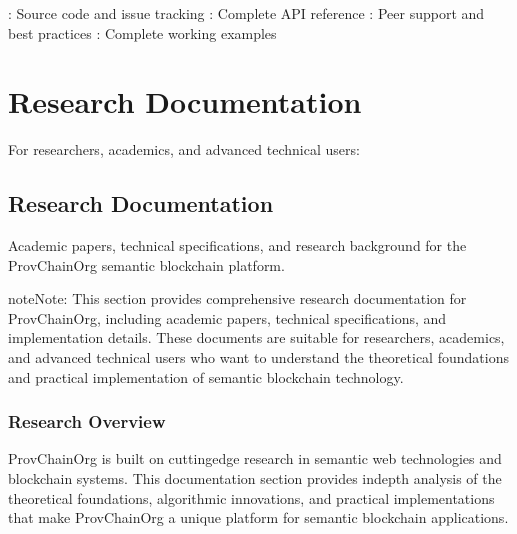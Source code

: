 \documentclass[letterpaper,10pt,english]{sphinxmanual}
\begin{document}
\sphinxAtStartPar
{}
\sphinxhyphen{} : Source code and issue tracking
\sphinxhyphen{} : Complete API reference
\sphinxhyphen{} : Peer support and best practices
\sphinxhyphen{} : Complete working examples




\section{Research Documentation}
\label{\detokenize{index:research-documentation}}
\sphinxAtStartPar
For researchers, academics, and advanced technical users:

\sphinxstepscope


\subsection{Research Documentation}
\label{\detokenize{research/index:research-documentation}}\label{\detokenize{research/index::doc}}
\sphinxAtStartPar
Academic papers, technical specifications, and research background for the ProvChainOrg semantic blockchain platform.



\begin{sphinxadmonition}{note}{Note:}
\sphinxAtStartPar
This section provides comprehensive research documentation for ProvChainOrg, including academic papers, technical specifications, and implementation details. These documents are suitable for researchers, academics, and advanced technical users who want to understand the theoretical foundations and practical implementation of semantic blockchain technology.
\end{sphinxadmonition}


\subsubsection{Research Overview}
\label{\detokenize{research/index:research-overview}}
\sphinxAtStartPar
ProvChainOrg is built on cutting\sphinxhyphen{}edge research in semantic web technologies and blockchain systems. This documentation section provides in\sphinxhyphen{}depth analysis of the theoretical foundations, algorithmic innovations, and practical implementations that make ProvChainOrg a unique platform for semantic blockchain applications.
\end{document}
